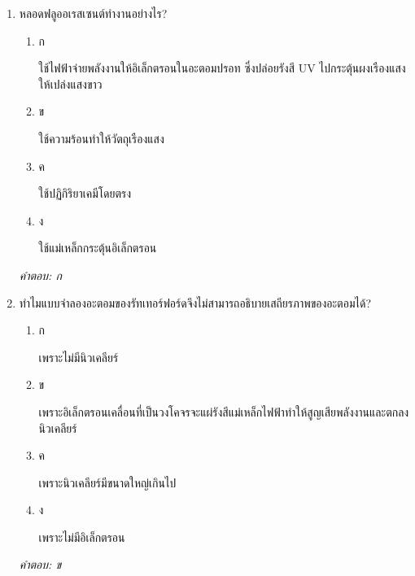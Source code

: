 \documentclass[12pt]{article}
\begin{document}
\begin{enumerate}[label=\arabic*., itemsep=0.5\baselineskip, topsep=0.5\baselineskip, leftmargin=*]
\item หลอดฟลูออเรสเซนต์ทำงานอย่างไร?
\begin{enumerate}[label=\alph*)., itemsep=0.3\baselineskip, topsep=0.3\baselineskip]
\item ก\ 
\begin{minipage}[t]{0.9\linewidth}
\raggedright ใช้ไฟฟ้าจ่ายพลังงานให้อิเล็กตรอนในอะตอมปรอท ซึ่งปล่อยรังสี UV ไปกระตุ้นผงเรืองแสงให้เปล่งแสงขาว
\end{minipage}
\item ข\ 
\begin{minipage}[t]{0.9\linewidth}
\raggedright ใช้ความร้อนทำให้วัตถุเรืองแสง
\end{minipage}
\item ค\ 
\begin{minipage}[t]{0.9\linewidth}
\raggedright ใช้ปฏิกิริยาเคมีโดยตรง
\end{minipage}
\item ง\ 
\begin{minipage}[t]{0.9\linewidth}
\raggedright ใช้แม่เหล็กกระตุ้นอิเล็กตรอน
\end{minipage}
\end{enumerate}
\vspace{-0.3\baselineskip}
\begin{small}
\textit{คำตอบ: ก}
\end{small}

\item ทำไมแบบจำลองอะตอมของรัทเทอร์ฟอร์ดจึงไม่สามารถอธิบายเสถียรภาพของอะตอมได้?
\begin{enumerate}[label=\alph*)., itemsep=0.3\baselineskip, topsep=0.3\baselineskip]
\item ก\ 
\begin{minipage}[t]{0.9\linewidth}
\raggedright เพราะไม่มีนิวเคลียร์
\end{minipage}
\item ข\ 
\begin{minipage}[t]{0.9\linewidth}
\raggedright เพราะอิเล็กตรอนเคลื่อนที่เป็นวงโคจรจะแผ่รังสีแม่เหล็กไฟฟ้าทำให้สูญเสียพลังงานและตกลงนิวเคลียร์
\end{minipage}
\item ค\ 
\begin{minipage}[t]{0.9\linewidth}
\raggedright เพราะนิวเคลียร์มีขนาดใหญ่เกินไป
\end{minipage}
\item ง\ 
\begin{minipage}[t]{0.9\linewidth}
\raggedright เพราะไม่มีอิเล็กตรอน
\end{minipage}
\end{enumerate}
\vspace{-0.3\baselineskip}
\begin{small}
\textit{คำตอบ: ข}
\end{small}


\end{enumerate}
\end{document}
